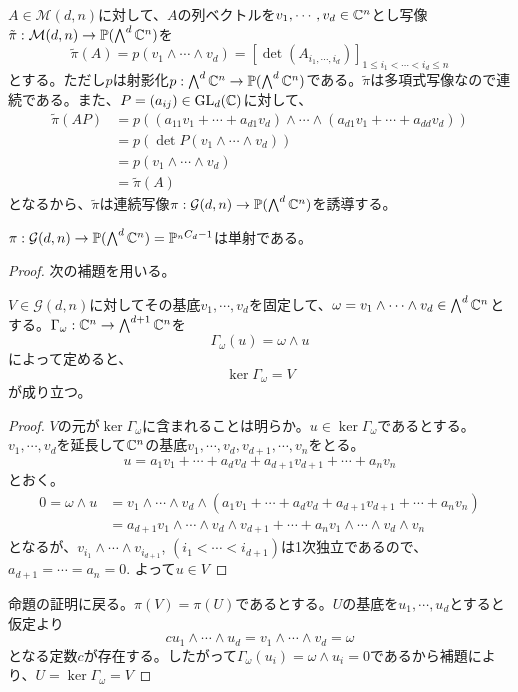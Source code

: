 \documentclass{ltjsreport}
\begin{document}
$A\in\mathcal{M}(d,n)$に対して、$A$の列ベクトルを$v_1,\cdots,v_d\in\mathbb{C}^n$とし写像$\tilde{\pi}:\mathcal{M}(d,n)\rightarrow \mathbb{P}(\bigwedge^d\mathbb{C}^n)$を
\[
\tilde{\pi}(A)=p(v_1\wedge\cdots\wedge v_d)=[\det(A_{i_1,\cdots,i_d})]_{1\leq i_1<\cdots<i_d\leq n}  
\]
とする。ただし$p$は射影化$p:\bigwedge^d\mathbb{C}^n\rightarrow \mathbb{P}(\bigwedge^d\mathbb{C}^n)$である。$\tilde{\pi}$は多項式写像なので連続である。また、$P=(a_{ij})\in\text{GL}_d(\mathbb{C})$に対して、
\begin{align*}
  \tilde{\pi}(AP)
  &=p\left(
    (a_{11}v_1+\cdots+a_{d1}v_d)\wedge\cdots\wedge
    (a_{d1}v_1+\cdots+a_{dd}v_d)
  \right)\\
  &=p(\det P(v_1\wedge\cdots\wedge v_d))\\
  &=p(v_1\wedge\cdots\wedge v_d)\\
  &=\tilde{\pi}(A)
\end{align*}
となるから、$\tilde{\pi}$は連続写像$\pi:\mathcal{G}(d,n)\rightarrow \mathbb{P}(\bigwedge^d\mathbb{C}^n)$を誘導する。


\begin{prop}[Plucker埋め込み]\label{plucker}
  $\pi:\mathcal{G}(d,n)\rightarrow \mathbb{P}(\bigwedge^d\mathbb{C}^n)=\mathbb{P}^{_{n}C_{d}-1}$は単射である。
\end{prop}

\begin{proof}
  次の補題を用いる。
  \begin{lemm}\label{ker_wedge}
    $V\in\mathcal{G}(d,n)$に対してその基底$v_1,\cdots,v_d$を固定して、$\omega=v_1\wedge\cdots\wedge v_d\in\bigwedge^d\mathbb{C}^n$とする。$\Gamma_\omega:\mathbb{C}^n\rightarrow \bigwedge^{d+1}\mathbb{C}^n$を
    \[
    \Gamma_\omega(u)=\omega\wedge u  
    \]
    によって定めると、
    \begin{equation*}
      \ker\Gamma_\omega =V
    \end{equation*}
    が成り立つ。
  \end{lemm}
  
  \begin{proof}
    $V$の元が$\ker\Gamma_\omega$に含まれることは明らか。$u\in\ker\Gamma_\omega$であるとする。$v_1,\cdots,v_d$を延長して$\mathbb{C}^n$の基底$v_1,\cdots,v_d,v_{d+1},\cdots,v_n$をとる。
    \[
    u=a_{1}v_1+\cdots+a_{d}v_d+a_{d+1}v_{d+1}+\cdots+a_nv_n  
    \]
    とおく。
    \begin{align*}
    0=\omega\wedge u
    &=v_1\wedge\cdots\wedge v_d\wedge(a_{1}v_1+\cdots+a_{d}v_d+a_{d+1}v_{d+1}+\cdots+a_nv_n )  \\
    &=a_{d+1}v_1\wedge\cdots\wedge v_d\wedge v_{d+1}
        +\cdots+
      a_{n}v_1\wedge\cdots\wedge v_d\wedge v_{n}
    \end{align*}
    となるが、$v_{i_1}\wedge\cdots\wedge v_{i_{d+1}}$, $(i_1<\cdots<i_{d+1})$は1次独立であるので、$a_{d+1}=\cdots=a_n=0$. よって$u\in V$
  \end{proof}

  命題の証明に戻る。$\pi(V)=\pi(U)$であるとする。$U$の基底を$u_1,\cdots,u_d$とすると仮定より
  \[
  cu_1\wedge\cdots\wedge u_d=v_1\wedge\cdots\wedge v_d=\omega  
  \]
  となる定数$c$が存在する。したがって$\Gamma_\omega(u_i)=\omega\wedge u_i=0$であるから補題により、$U=\ker\Gamma_\omega= V$
\end{proof}
  
\end{document}
